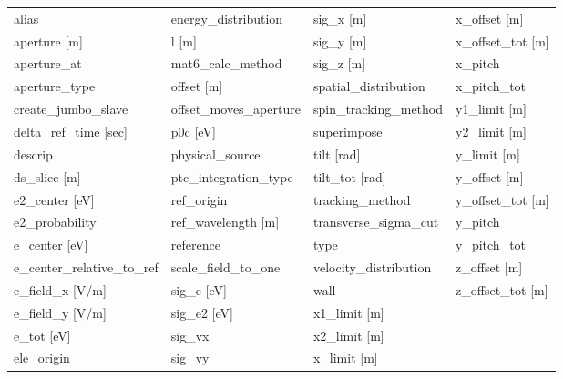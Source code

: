  \begin{tabular}{llll} \toprule
alias                          & energy_distribution            & sig_x [m]                      & x_offset [m]                   \\
aperture [m]                   & l [m]                          & sig_y [m]                      & x_offset_tot [m]               \\
aperture_at                    & mat6_calc_method               & sig_z [m]                      & x_pitch                        \\
aperture_type                  & offset [m]                     & spatial_distribution           & x_pitch_tot                    \\
create_jumbo_slave             & offset_moves_aperture          & spin_tracking_method           & y1_limit [m]                   \\
delta_ref_time [sec]           & p0c [eV]                       & superimpose                    & y2_limit [m]                   \\
descrip                        & physical_source                & tilt [rad]                     & y_limit [m]                    \\
ds_slice [m]                   & ptc_integration_type           & tilt_tot [rad]                 & y_offset [m]                   \\
e2_center [eV]                 & ref_origin                     & tracking_method                & y_offset_tot [m]               \\
e2_probability                 & ref_wavelength [m]             & transverse_sigma_cut           & y_pitch                        \\
e_center [eV]                  & reference                      & type                           & y_pitch_tot                    \\
e_center_relative_to_ref       & scale_field_to_one             & velocity_distribution          & z_offset [m]                   \\
e_field_x [V/m]                & sig_e [eV]                     & wall                           & z_offset_tot [m]               \\
e_field_y [V/m]                & sig_e2 [eV]                    & x1_limit [m]                   &                                \\
e_tot [eV]                     & sig_vx                         & x2_limit [m]                   &                                \\
ele_origin                     & sig_vy                         & x_limit [m]                    &                                \\
 \bottomrule
 \end{tabular}
 \vfill
 
